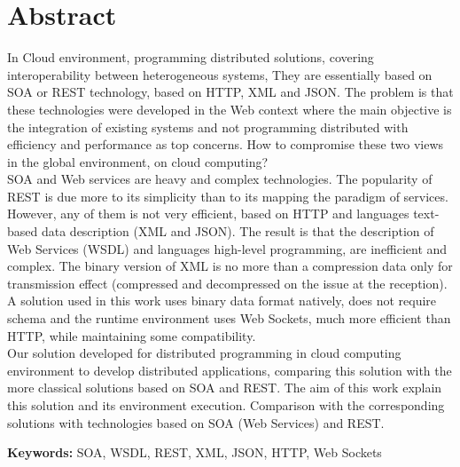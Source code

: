 
\section*{Abstract}


In Cloud environment, programming distributed solutions, covering interoperability between heterogeneous systems,
They are essentially based on SOA or REST technology, based on HTTP, XML and JSON. The problem is that these technologies
were developed in the Web context where the main objective is the integration of existing systems and not programming
distributed with efficiency and performance as top concerns. How to compromise these two views in the global environment,
on cloud computing?\\

SOA and Web services are heavy and complex technologies. The popularity of REST is due more to its simplicity than to its
mapping the paradigm of services. However, any of them is not very efficient, based on HTTP and languages
text-based data description (XML and JSON). The result is that the description of Web Services (WSDL) and languages
high-level programming, are inefficient and complex. The binary version of XML is no more than a compression
data only for transmission effect (compressed and decompressed on the issue at the reception). A solution used in this
work uses binary data format natively, does not require schema and the runtime environment uses Web Sockets,
much more efficient than HTTP, while maintaining some compatibility.\\

Our solution developed for distributed programming in cloud computing environment to develop
distributed applications, comparing this solution with the more classical solutions based on SOA and REST.
The aim of this work explain this solution and its environment
execution. Comparison with the corresponding solutions with technologies based on SOA (Web Services)
and REST.

\vfill

\textbf{\Large Keywords:} SOA, WSDL, REST, XML, JSON, HTTP, Web Sockets
